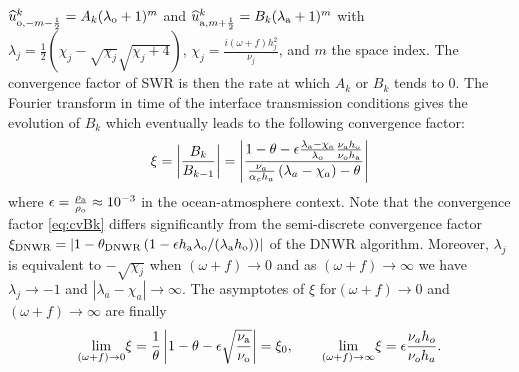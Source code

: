 $\widehat{u}_{{\rm o}, -m - \frac{1}{2}}^k = A_k (\lambda_{\rm o}+1)^m$
and
$\widehat{u}_{{\rm a}, m + \frac{1}{2}}^k = B_k (\lambda_{\rm a}+1)^m$ 
with $\lambda_j = \frac{1}{2}\left(\chi_j - \sqrt{\chi_j} \sqrt{\chi_j + 4}\right)$,
$\chi_j=\frac{i (\omega+f) h_j^2}{\nu_j}$,
and $m$ the space index. The convergence factor of SWR is then
the rate at which $A_k$ or $B_k$ tends to 0.
The Fourier transform in time of the interface
transmission conditions gives
the evolution of $B_k$ which eventually leads to 
the following convergence factor: 
\begin{equation} \label{eq:cvBk}
\xi = \left|\frac{B_k}{B_{k-1}}\right| = 
\left|
	\frac{1 - \theta - \epsilon \frac{\lambda_{\rm a} - \chi_{\rm a}}
		{\lambda_{\rm o}} \frac{\nu_{\rm a} h_{\rm o}}
			{\nu_{\rm o} h_{\rm a}}}
	{\frac{\nu_a}{\alpha_c h_a}
	\left(\lambda_a - \chi_a \right)
	- \theta}
\right|
\end{equation}
where $\epsilon = \frac{\rho_{\rm a}}{\rho_{\rm o}} \approx 10^{-3}$
in the ocean-atmosphere  context.
Note that the convergence factor \eqref{eq:cvBk} differs significantly from the semi-discrete convergence factor 
$\xi_{\rm DNWR} = \left|1 - \theta_{\rm DNWR} \left(
1 - \epsilon h_{\rm a} \lambda_{\rm o} / (\lambda_{\rm a}h_{\rm o})\right) \right|$ of 
the DNWR algorithm. 
Moreover, $\lambda_j$ is equivalent to $-\sqrt{\chi_j}$ when
$(\omega+f) \rightarrow 0$ and
as $(\omega+f) \rightarrow \infty$ we have
$\lambda_j\rightarrow -1$ and
$|\lambda_a - \chi_a| \rightarrow \infty$. The asymptotes
of $\xi$ for$(\omega+f) \rightarrow 0$ and
$(\omega+f) \rightarrow \infty$ are finally
\[
 \underset{(\omega+f) \rightarrow 0}{\mathrm{lim}} \xi = \frac{1}{\theta} \left| 1-\theta-\epsilon \sqrt{\frac{\nu_{\rm a}}{\nu_{\rm o}}}  \right| = \xi_0, \qquad
 \underset{(\omega+f) \rightarrow \infty}{\mathrm{lim}} \xi =
 \epsilon \frac{\nu_a h_o}{\nu_o h_a}.
\]
